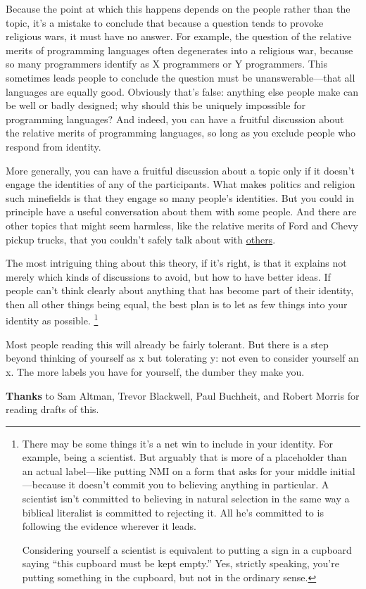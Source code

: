 Because the point at which this happens depends on the people rather
than the topic, it's a mistake to conclude that because a question tends
to provoke religious wars, it must have no answer. For example, the
question of the relative merits of programming languages often
degenerates into a religious war, because so many programmers identify
as X programmers or Y programmers. This sometimes leads people to
conclude the question must be unanswerable---that all languages are
equally good. Obviously that's false: anything else people make can be
well or badly designed; why should this be uniquely impossible for
programming languages? And indeed, you can have a fruitful discussion
about the relative merits of programming languages, so long as you
exclude people who respond from identity.

More generally, you can have a fruitful discussion about a topic only if
it doesn't engage the identities of any of the participants. What makes
politics and religion such minefields is that they engage so many
people's identities. But you could in principle have a useful
conversation about them with some people. And there are other topics
that might seem harmless, like the relative merits of Ford and Chevy
pickup trucks, that you couldn't safely talk about with
\href{http://www.theledger.com/apps/pbcs.dll/article?AID=/20060418/NEWS/604180378/1039}{others}.

The most intriguing thing about this theory, if it's right, is that it
explains not merely which kinds of discussions to avoid, but how to have
better ideas. If people can't think clearly about anything that has
become part of their identity, then all other things being equal, the
best plan is to let as few things into your identity as possible.
\footnote{There may be some things it's a net win to include in your
identity. For example, being a scientist. But arguably that is more of a
placeholder than an actual label---like putting NMI on a form that asks
for your middle initial---because it doesn't commit you to believing
anything in particular. A scientist isn't committed to believing in
natural selection in the same way a biblical literalist is committed to
rejecting it. All he's committed to is following the evidence wherever
it leads.

Considering yourself a scientist is equivalent to putting a sign in a
cupboard saying ``this cupboard must be kept empty.'' Yes, strictly
speaking, you're putting something in the cupboard, but not in the
ordinary sense.}

Most people reading this will already be fairly tolerant. But there is a
step beyond thinking of yourself as x but tolerating y: not even to
consider yourself an x. The more labels you have for yourself, the
dumber they make you.


\textbf{Thanks} to Sam Altman, Trevor Blackwell, Paul Buchheit, and
Robert Morris for reading drafts of this.